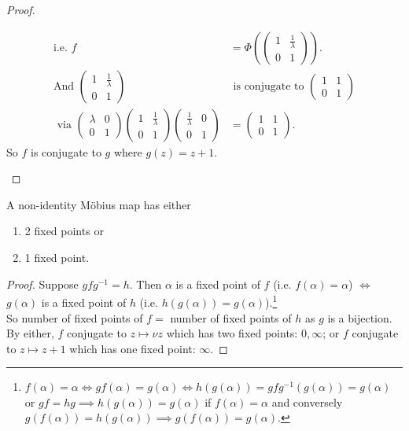 \begin{proof}
\begin{enumerate}
\begin{align*}
            \text{i.e. } f &= \Phi \left( \begin{pmatrix}1 & \frac{1}{\lambda} \\0 & 1\end{pmatrix} \right). \\
            \text{And } \begin{pmatrix}1 & \frac{1}{\lambda} \\0 & 1\end{pmatrix} &\text{ is conjugate to } \begin{pmatrix}1 & 1 \\0 & 1\end{pmatrix} \\ 
            \text{ via } \begin{pmatrix}\lambda & 0 \\ 0 & 1 \end{pmatrix}  \begin{pmatrix}1 & \frac{1}{\lambda} \\0 & 1\end{pmatrix} \begin{pmatrix}\frac{1}{\lambda} & 0 \\ 0 & 1 \end{pmatrix} &= \begin{pmatrix}1 & 1 \\0 & 1\end{pmatrix}.
        \end{align*}
        So $f$ is conjugate to $g$ where $g(z) = z + 1$.
    \end{enumerate} 
\end{proof} 

\begin{corollary} \label{cor:8}
    A non-identity M\"obius map has either 
    \begin{enumerate}
        \item 2 fixed points or
        \item 1 fixed point.
    \end{enumerate} 
\end{corollary} 

\begin{proof}
    Suppose $g f g^{-1} = h$.
    Then $\alpha$ is a fixed point of $f$ (i.e. $f(\alpha) = \alpha$) $\iff$ $g(\alpha)$ is a fixed point of $h$ (i.e. $h(g(\alpha)) = g(\alpha)$).\footnote{$f(\alpha) = \alpha \iff gf(\alpha) = g(\alpha) \iff h(g(\alpha)) = gfg^{-1}(g(\alpha)) = g(\alpha)$ or $g f = h g \implies h(g(\alpha)) = g(\alpha)$ if $f(\alpha) = \alpha$ and conversely $g(f(\alpha)) = h(g(\alpha)) \implies g(f(\alpha)) = g(\alpha)$.} \\
    So number of fixed points of $f = $ number of fixed points of $h$ as $g$ is a bijection.
    By  either, $f$ conjugate to $z \mapsto \nu z$ which has two fixed points: $0, \infty$; or $f$ conjugate to $z \mapsto z + 1$ which has one fixed point: $\infty$.
\end{proof} 

